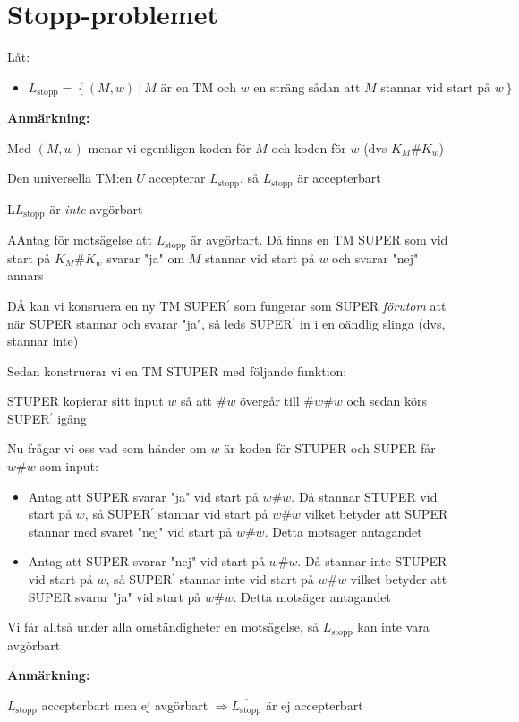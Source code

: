 \section{Stopp-problemet}\par
\noindent Låt:\par
\begin{itemize}
  \item $L_{\text{stopp}} = \left\{(M,w)\:|\:\text{$M$ är en TM och $w$ en sträng sådan att $M$ stannar vid start på $w$}\right\}$
\end{itemize}
\par\bigskip
\noindent\textbf{Anmärkning:}\par
\noindent Med $(M,w)$ menar vi egentligen koden för $M$ och koden för $w$ (dvs $K_M\#K_w$)
\par\bigskip
\noindent Den universella TM:en $U$ accepterar $L_{\text{stopp}}$, så $L_{\text{stopp}}$ är accepterbart
\par\bigskip
\begin{theo}
  L$L_{\text{stopp}}$ är \textit{inte} avgörbart
\end{theo}
\par\bigskip
\begin{prf}
  AAntag för motsägelse att $L_{\text{stopp}}$ är avgörbart. Då finns en TM SUPER som vid start på $K_M\#K_w$ svarar "ja" om $M$ stannar vid start på $w$ och svarar "nej" annars
  \par\bigskip
  \noindent DÅ kan vi konsruera en ny TM SUPER$^{\prime}$ som fungerar som SUPER \textit{förutom} att när SUPER stannar och svarar "ja", så leds SUPER$^{\prime}$ in i en oändlig slinga (dvs, stannar inte)
  \par\bigskip
  \noindent Sedan konstruerar vi en TM STUPER med följande funktion:\par
  STUPER kopierar sitt input $w$ så att $\#w$ övergår till $\#w\#w$ och sedan körs SUPER$^{\prime}$ igång
  \par\bigskip
  \noindent Nu frågar vi oss vad som händer om $w$ är koden för STUPER och SUPER får $w\#w$ som input:\par
  \begin{itemize}
    \item Antag att SUPER svarar "ja" vid start på $w\#w$. Då stannar STUPER vid start på $w$, så SUPER$^{\prime}$ stannar vid start på $w\#w$ vilket betyder att SUPER stannar med svaret "nej" vid start på $w\#w$. Detta motsäger antagandet\par
  \item  Antag att SUPER svarar "nej" vid start på $w\#w$. Då stannar inte STUPER vid start på $w$, så SUPER$^{\prime}$ stannar inte vid start på $w\#w$ vilket betyder att SUPER svarar "ja" vid start på $w\#w$. Detta motsäger antagandet
  \end{itemize}
  \par\bigskip
  \noindent Vi får alltså under alla omständigheter en motsägelse, så $L_{\text{stopp}}$ kan inte vara avgörbart
\end{prf}
\par\bigskip
\noindent\textbf{Anmärkning:}\par
\noindent $L_{\text{stopp}}$ accepterbart men ej avgörbart $\Rightarrow\overline{L_{\text{stopp}}}$ är ej accepterbart
